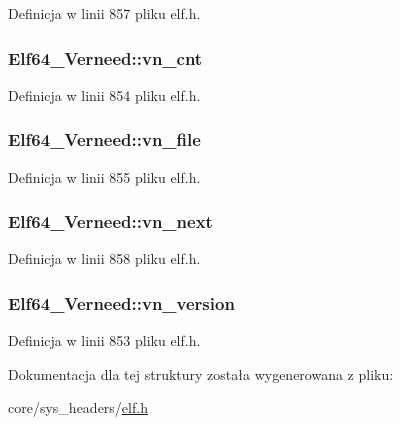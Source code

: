 Definicja w linii 857 pliku elf.\-h.

\hypertarget{struct_elf64___verneed_ab8bae5b901cc7007685f35d43cf63884}{
\subsubsection[{vn\-\_\-cnt}]{ Elf64\-\_\-\-Verneed\-::vn\-\_\-cnt}}\label{struct_elf64___verneed_ab8bae5b901cc7007685f35d43cf63884}


Definicja w linii 854 pliku elf.\-h.

\hypertarget{struct_elf64___verneed_acb9149fec79d7eefb3f1d6300be2125f}{
\subsubsection[{vn\-\_\-file}]{ Elf64\-\_\-\-Verneed\-::vn\-\_\-file}}\label{struct_elf64___verneed_acb9149fec79d7eefb3f1d6300be2125f}


Definicja w linii 855 pliku elf.\-h.

\hypertarget{struct_elf64___verneed_a8036329a9f5ad3a4006f16cbe3c9e866}{
\subsubsection[{vn\-\_\-next}]{ Elf64\-\_\-\-Verneed\-::vn\-\_\-next}}\label{struct_elf64___verneed_a8036329a9f5ad3a4006f16cbe3c9e866}


Definicja w linii 858 pliku elf.\-h.

\hypertarget{struct_elf64___verneed_abbe3d560e7f69253f3c468f2c9d30f99}{
\subsubsection[{vn\-\_\-version}]{ Elf64\-\_\-\-Verneed\-::vn\-\_\-version}}\label{struct_elf64___verneed_abbe3d560e7f69253f3c468f2c9d30f99}


Definicja w linii 853 pliku elf.\-h.



Dokumentacja dla tej struktury została wygenerowana z pliku\-:\begin{DoxyCompactItemize}
\item 
core/sys\-\_\-headers/\hyperlink{elf_8h}{elf.\-h}\end{DoxyCompactItemize}
